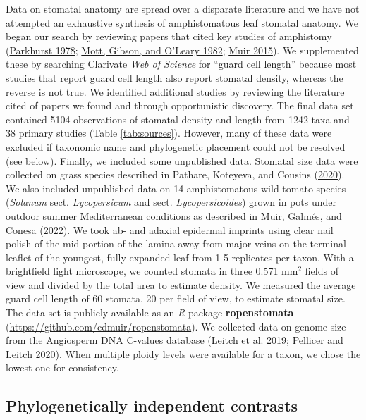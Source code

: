 \documentclass[
  12pt,
]{article}
\begin{document}
Data on stomatal anatomy are spread over a disparate literature and we have not attempted an exhaustive synthesis of amphistomatous leaf stomatal anatomy. We began our search by reviewing papers that cited key studies of amphistomy (\protect\hyperlink{ref-parkhurst_adaptive_1978}{Parkhurst 1978}; \protect\hyperlink{ref-mott_adaptive_1982}{Mott, Gibson, and O'Leary 1982}; \protect\hyperlink{ref-muir_making_2015}{Muir 2015}). We supplemented these by searching Clarivate \emph{Web of Science} for ``guard cell length'' because most studies that report guard cell length also report stomatal density, whereas the reverse is not true. We identified additional studies by reviewing the literature cited of papers we found and through opportunistic discovery. The final data set contained 5104 observations of stomatal density and length from 1242 taxa and 38 primary studies (Table \ref{tab:sources}). However, many of these data were excluded if taxonomic name and phylogenetic placement could not be resolved (see below). Finally, we included some unpublished data. Stomatal size data were collected on grass species described in Pathare, Koteyeva, and Cousins (\protect\hyperlink{ref-pathare_increased_2020}{2020}). We also included unpublished data on 14 amphistomatous wild tomato species (\emph{Solanum} sect. \emph{Lycopersicum} and sect. \emph{Lycopersicoides}) grown in pots under outdoor summer Mediterranean conditions as described in Muir, Galmés, and Conesa (\protect\hyperlink{ref-muir_unpublished_2022}{2022}). We took ab- and adaxial epidermal imprints using clear nail polish of the mid-portion of the lamina away from major veins on the terminal leaflet of the youngest, fully expanded leaf from 1-5 replicates per taxon. With a brightfield light microscope, we counted stomata in three 0.571 mm\(^2\) fields of view and divided by the total area to estimate density. We measured the average guard cell length of 60 stomata, 20 per field of view, to estimate stomatal size. The data set is publicly available as an \emph{R} package \textbf{ropenstomata} (\url{https://github.com/cdmuir/ropenstomata}). We collected data on genome size from the Angiosperm DNA C-values database (\protect\hyperlink{ref-leitch_angiosperm_2019}{Leitch et al. 2019}; \protect\hyperlink{ref-pellicer_plant_2020}{Pellicer and Leitch 2020}). When multiple ploidy levels were available for a taxon, we chose the lowest one for consistency.

\hypertarget{phylogenetically-independent-contrasts}{%
\subsection{Phylogenetically independent contrasts}\label{phylogenetically-independent-contrasts}}
\end{document}
